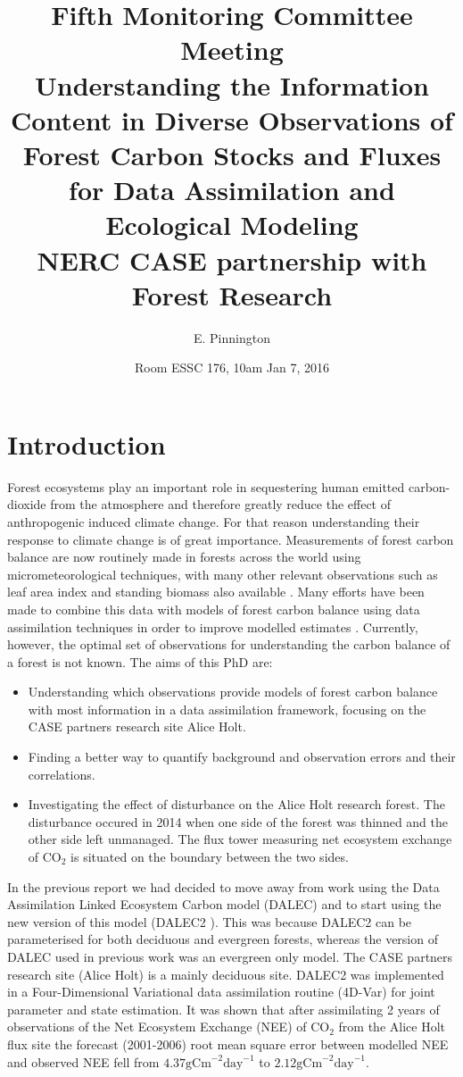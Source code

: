 \documentclass[11pt]{article}
\title{Fifth Monitoring Committee Meeting \\\vspace{4mm} \normalsize{Understanding the Information Content in Diverse Observations of Forest Carbon Stocks and Fluxes for Data Assimilation and Ecological Modeling\\ NERC CASE partnership with Forest Research}}
\author{\normalsize{E. Pinnington}}
\date{\normalsize{Room ESSC 176, 10am Jan 7, 2016}}
\begin{document}
\maketitle

\section{Introduction} \label{sec:intro}

Forest ecosystems play an important role in sequestering human emitted carbon-dioxide from the atmosphere and therefore greatly reduce the effect of anthropogenic induced climate change. For that reason understanding their response to climate change is of great importance. Measurements of forest carbon balance are now routinely made in forests across the world using micrometeorological techniques, with many other relevant observations such as leaf area index and standing biomass also available \citep{baldocchi2008turner}. Many efforts have been made to combine this data with models of forest carbon balance using data assimilation techniques in order to improve modelled estimates \citep{zobitz2011primer, fox2009reflex, richardson2010estimating, Quaife2008, Zobitz2014, Niu2014}. Currently, however, the optimal set of observations for understanding the carbon balance of a forest is not known. The aims of this PhD are:

\begin{itemize}
\item Understanding which observations provide models of forest carbon balance with most information in a data assimilation framework, focusing on the CASE partners research site Alice Holt.
\item Finding a better way to quantify background and observation errors and their correlations.
\item Investigating the effect of disturbance on the Alice Holt research forest. The disturbance occured in 2014 when one side of the forest was thinned and the other side left unmanaged. The flux tower measuring net ecosystem exchange of $\text{CO}_{2}$ is situated on the boundary between the two sides. 
\end{itemize}

In the previous report we had decided to move away from work using the Data Assimilation Linked Ecosystem Carbon model (DALEC) and to start using the new version of this model (DALEC2 \citep{Bloom2015}). This was because DALEC2 can be parameterised for both deciduous and evergreen forests, whereas the version of DALEC used in previous work was an evergreen only model. The CASE partners research site (Alice Holt) is a mainly deciduous site. DALEC2 was implemented in a Four-Dimensional Variational data assimilation routine (4D-Var) for joint parameter and state estimation. It was shown that after assimilating 2 years of observations of the Net Ecosystem Exchange (NEE) of CO$_{2}$ from the Alice Holt flux site the forecast (2001-2006) root mean square error between modelled NEE and observed NEE fell from $4.37 \text{gCm}^{-2}\text{day}^{-1}$ to $2.12 \text{gCm}^{-2}\text{day}^{-1}$.
\end{document}
